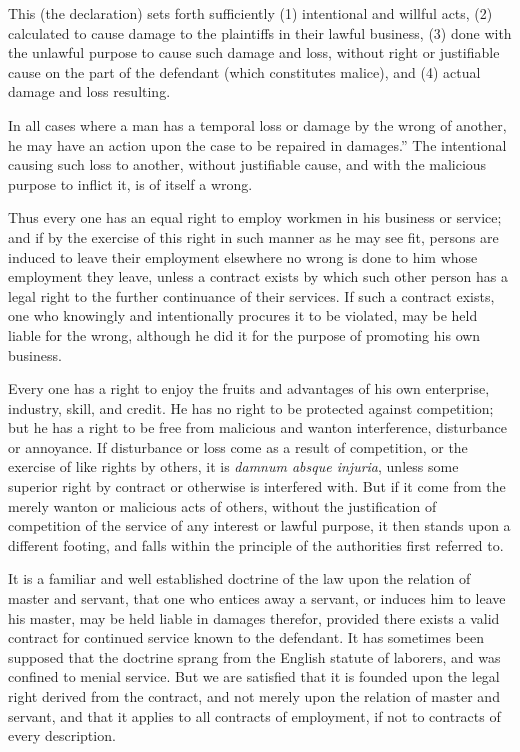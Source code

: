 \documentclass[
  letterpaper,
  11pt,
  DIV=9,
  openright]{scrbook}
\renewenvironment{quote}{
  \list{}{\leftmargin=2em\rightmargin=2em}
  \item\relax\small
}
{\endlist}
\begin{document}
\begin{quote}
This (the declaration) sets forth sufficiently (1) intentional and
willful acts, (2) calculated to cause damage to the plaintiffs in their
lawful business, (3) done with the unlawful purpose to cause such damage
and loss, without right or justifiable cause on the part of the
defendant (which constitutes malice), and (4) actual damage and loss
resulting.

In all cases where a man has a temporal loss or damage by the wrong of
another, he may have an action upon the case to be repaired in
damages.'' The intentional causing such loss to another, without
justifiable cause, and with the malicious purpose to inflict it, is of
itself a wrong.

Thus every one has an equal right to employ workmen in his business or
service; and if by the exercise of this right in such manner as he may
see fit, persons are induced to leave their employment elsewhere no
wrong is done to him whose employment they leave, unless a contract
exists by which such other person has a legal right to the further
continuance of their services. If such a contract exists, one who
knowingly and intentionally procures it to be violated, may be held
liable for the wrong, although he did it for the purpose of promoting
his own business.

Every one has a right to enjoy the fruits and advantages of his own
enterprise, industry, skill, and credit. He has no right to be protected
against competition; but he has a right to be free from malicious and
wanton interference, disturbance or annoyance. If disturbance or loss
come as a result of competition, or the exercise of like rights by
others, it is \emph{damnum absque injuria}, unless some superior right
by contract or otherwise is interfered with. But if it come from the
merely wanton or malicious acts of others, without the justification of
competition of the service of any interest or lawful purpose, it then
stands upon a different footing, and falls within the principle of the
authorities first referred to.

It is a familiar and well established doctrine of the law upon the
relation of master and servant, that one who entices away a servant, or
induces him to leave his master, may be held liable in damages therefor,
provided there exists a valid contract for continued service known to
the defendant. It has sometimes been supposed that the doctrine sprang
from the English statute of laborers, and was confined to menial
service. But we are satisfied that it is founded upon the legal right
derived from the contract, and not merely upon the relation of master
and servant, and that it applies to all contracts of employment, if not
to contracts of every description.
\end{quote}
\end{document}
